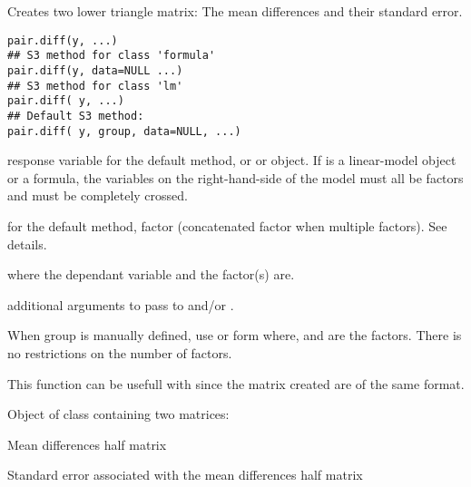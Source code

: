 \documentclass[a4paper]{book}
\begin{document}
%
\begin{Description}\relax
Creates two lower triangle matrix: The mean differences and their standard error.
\end{Description}
%
\begin{Usage}
\begin{verbatim}
pair.diff(y, ...)
## S3 method for class 'formula'
pair.diff(y, data=NULL ...)
## S3 method for class 'lm'
pair.diff( y, ...)
## Default S3 method:
pair.diff( y, group, data=NULL, ...)
\end{verbatim}
\end{Usage}
%
\begin{Arguments}
\begin{ldescription}
\item[\code{y}] response variable for the default method, or  or
 object. If  is a linear-model object or a formula,
the variables on the right-hand-side of the model must all be factors and
must be completely crossed.
\item[\code{group}] for the default method, factor (concatenated factor when multiple factors). See details.
\item[\code{data}]  where the dependant variable and the factor(s) are.
\item[\code{...}]  additional arguments to pass to  and/or . 
\end{ldescription}
\end{Arguments}
%
\begin{Details}\relax
When group is manually defined, use  or form where,  and  are the factors. There is no restrictions on the number of factors.

This function can be usefull with  since the matrix created are of the same format.
\end{Details}
%
\begin{Value}
Object of class  containing two matrices:

\begin{ldescription}
\item[\code{diff.m  }] Mean differences half matrix 
\item[\code{diff.se }] Standard error associated with the mean differences half matrix

\end{ldescription}
\end{Value}
\end{document}
